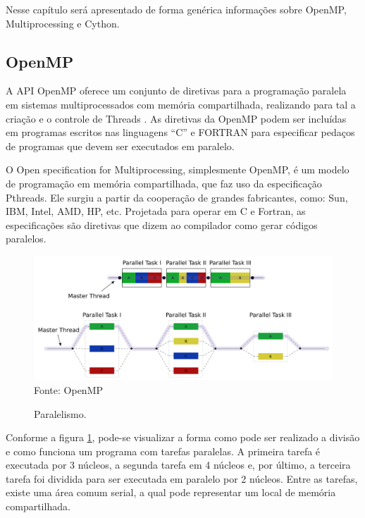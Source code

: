 \documentclass[a4paper,12pt]{article}
\begin{document}
Nesse capítulo será apresentado de forma genérica informações sobre OpenMP, Multiprocessing e Cython. 
\subsection{OpenMP}

A API OpenMP oferece um conjunto de diretivas para a programação paralela em sistemas multiprocessados com memória compartilhada, realizando para tal a criação e o controle de Threads \cite{sato}. As diretivas da OpenMP podem ser incluídas em programas escritos nas linguagens “C” e FORTRAN para especificar pedaços de programas que devem ser executados em paralelo.

O Open specification for Multiprocessing, simplesmente OpenMP, é um modelo de programação em memória compartilhada, que faz uso da especificação Pthreads. Ele surgiu a partir da cooperação de grandes fabricantes, como: Sun, IBM, Intel, AMD, HP, etc. Projetada para operar em C e Fortran, as especificações são diretivas que dizem ao compilador como gerar códigos paralelos. 


\begin{figure}[!htb]
  \centering
  \caption{Paralelismo.}
  \includegraphics[width=15cm]{pictures/parallel.png}
  \footnotesize{Fonte: OpenMP\footnotemark}
\label{fig:parallel}
\end{figure}

Conforme a figura \ref{fig:parallel}, pode-se visualizar a forma como pode ser realizado a divisão e como funciona um programa com tarefas paralelas. A primeira tarefa é executada por 3 núcleos, a segunda tarefa em 4 núcleos e, por último, a terceira tarefa foi dividida para ser executada em paralelo por 2 núcleos. Entre as tarefas, existe uma área comum serial, a qual pode representar um local de memória compartilhada. 
\end{document}
